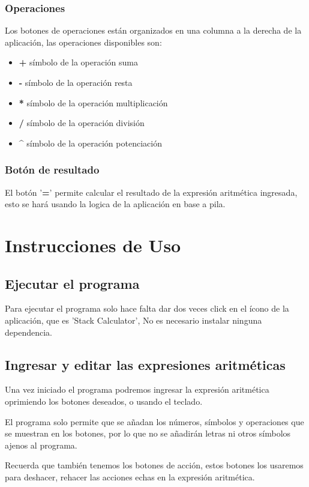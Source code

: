 \documentclass[a4paper,12pt]{article}
\begin{document}
\subsubsection{Operaciones}
Los botones de operaciones están organizados en una columna a la derecha de la aplicación, las operaciones disponibles son:
\begin{itemize}
    \item \textbf{+} símbolo de la operación suma 
    \item \textbf{-} símbolo de la operación resta
    \item \textbf{*} símbolo de la operación multiplicación 
    \item \textbf{/} símbolo de la operación división 
    \item \textbf{\^} símbolo de la operación potenciación 
\end{itemize}

\subsubsection{Botón de resultado}
El botón '\textbf{=}' permite calcular el resultado de la expresión aritmética ingresada, esto se hará usando la logica de la aplicación en base a pila.

\section{Instrucciones de Uso}
\subsection{Ejecutar el programa}
Para ejecutar el programa solo hace falta dar dos veces click en el ícono de la aplicación, que es 'Stack Calculator', No es necesario instalar ninguna dependencia.

\subsection{Ingresar y editar las expresiones aritméticas}
Una vez iniciado el programa podremos ingresar la expresión aritmética oprimiendo los botones deseados, o usando el teclado.

El programa solo permite que se añadan los números, símbolos y operaciones que se muestran en los botones, por lo que no se añadirán letras ni otros símbolos ajenos al programa.

Recuerda que también tenemos los botones de acción, estos botones los usaremos para deshacer, rehacer las acciones echas en la expresión aritmética.
\end{document}
